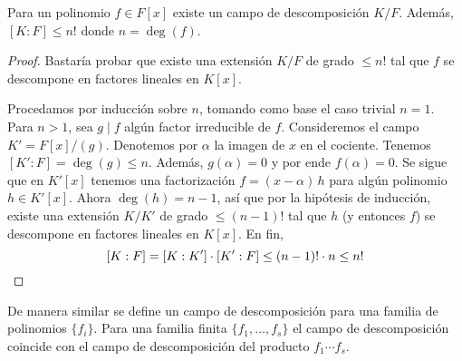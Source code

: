 \begin{proposicion}
  Para un polinomio $f \in F [x]$ existe un campo de descomposición
  $K/F$. Además, $[K : F] \le n!$ donde $n = \deg (f)$.

  \begin{proof}
    Bastaría probar que existe una extensión $K/F$ de grado $\le n!$ tal que $f$
    se descompone en factores lineales en $K [x]$.

    Procedamos por inducción sobre $n$, tomando como base el caso trivial
    $n = 1$. Para $n > 1$, sea $g \mid f$ algún factor irreducible de
    $f$. Consideremos el campo $K' = F [x] / (g)$. Denotemos por $\alpha$ la
    imagen de $x$ en el cociente. Tenemos $[K' : F] = \deg (g) \le n$. Además,
    $g (\alpha) = 0$ y por ende $f (\alpha) = 0$. Se sigue que en $K' [x]$
    tenemos una factorización $f = (x - \alpha)\,h$ para algún polinomio
    $h\in K' [x]$. Ahora $\deg (h) = n-1$, así que por la hipótesis de
    inducción, existe una extensión $K / K'$ de grado $\le (n-1)!$ tal que $h$
    (y entonces $f$) se descompone en factores lineales en $K [x]$. En fin,
    \[ [K : F] = [K : K']\cdot [K' : F] \le (n-1)!\cdot n \le n! \qedhere \]
  \end{proof}
\end{proposicion}

\begin{comentario}
  De manera similar se define un campo de descomposición para una familia de
  polinomios $\{ f_i \}$. Para una familia finita $\{ f_1, \ldots, f_s \}$
  el campo de descomposición coincide con el campo de descomposición del
  producto $f_1 \cdots f_s$.
\end{comentario}

